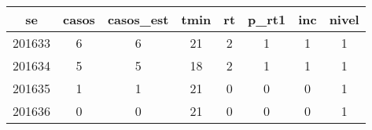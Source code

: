 \begin{tabular}{c|ccccccc}
  \hline
se & casos & casos\_est & tmin & rt & p\_rt1 & inc & nivel \\ 
  \hline
201633 & 6 & 6 & 21 & 2 & 1 & 1 & 1 \\ 
  201634 & 5 & 5 & 18 & 2 & 1 & 1 & 1 \\ 
  201635 & 1 & 1 & 21 & 0 & 0 & 0 & 1 \\ 
  201636 & 0 & 0 & 21 & 0 & 0 & 0 & 1 \\ 
   \hline
\end{tabular}
